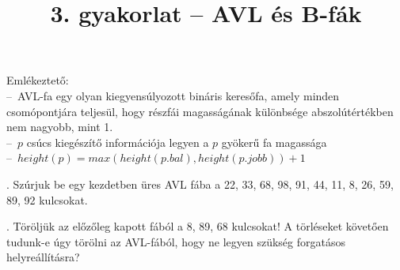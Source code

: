 \documentclass[12pt]{article}
\date{}
\title{3. gyakorlat -- AVL és B-fák}
\begin{document}
\maketitle

\noindent Emlékeztető:\\
--~AVL-fa egy olyan kiegyensúlyozott bináris keresőfa, amely minden 
csomópontjára teljesül, hogy részfái magasságának különbsége abszolútértékben 
nem nagyobb, mint 1.\\
--~$p$ csúcs kiegészítő információja legyen a $p$ gyökerű fa magassága\\
--~$height(p) = max(height(p.bal), height(p.jobb))+1$

\vspace{1.1em}

. Szúrjuk be egy kezdetben üres AVL fába a 22, 33, 68, 98, 91, 44, 11, 8, 26, 59, 89, 92 kulcsokat.

\begin{figure}[!h]
\centering
\end{figure}

. Töröljük az előzőleg kapott fából a 8, 89, 68 kulcsokat! A törléseket követően tudunk-e úgy törölni az AVL-fából, hogy ne legyen szükség forgatásos helyreállításra?
\end{document}
